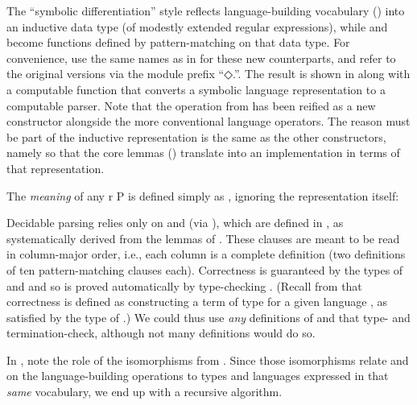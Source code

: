\documentclass[acmsmall,screen,timestamp]{acmart}  %
\begin{document}
The ``symbolic differentiation'' style reflects language-building vocabulary () into an inductive data type (of modestly extended regular expressions), while  and  become functions defined by pattern-matching on that data type.
For convenience, use the same names as in  for these new counterparts, and refer to the original versions via the module prefix ``{◇.}\hspace{0.05em}''.
The result is shown in  along with a computable function {} that converts a symbolic language representation to a computable parser.
Note that the  operation from  has been reified as a new constructor alongside the more conventional language operators.
The reason  must be part of the inductive representation is the same as the other constructors, namely so that the core lemmas () translate into an implementation in terms of that representation.

The \emph{meaning} of any {\AB r \AK{:}  \AB P} is defined simply as , ignoring the representation  itself:

Decidable parsing relies only on  and  (via {}), which are defined in , as systematically derived from the lemmas of .
These clauses are meant to be read in column-major order, i.e., each column is a complete definition (two definitions of ten pattern-matching clauses each).
Correctness is guaranteed by the types of  and  and so is proved automatically by type-checking .
(Recall from  that correctness is defined as constructing a term of type { } for a given language , as satisfied by the type of {}.)
We could thus use \emph{any} definitions of  and  that type- and termination-check, although not many definitions would do so.

In , note the role of the isomorphisms from .
Since those isomorphisms relate  and  on the language-building operations to types and languages expressed in that \emph{same} vocabulary, we end up with a recursive algorithm.

\rnc{}
\end{document}
